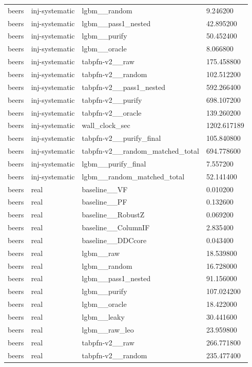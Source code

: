\begin{tabular}{llll}
beers & inj-systematic & lgbm\_\_random & 9.246200 \\
beers & inj-systematic & lgbm\_\_pass1\_nested & 42.895200 \\
beers & inj-systematic & lgbm\_\_purify & 50.452400 \\
beers & inj-systematic & lgbm\_\_oracle & 8.066800 \\
beers & inj-systematic & tabpfn-v2\_\_raw & 175.458800 \\
beers & inj-systematic & tabpfn-v2\_\_random & 102.512200 \\
beers & inj-systematic & tabpfn-v2\_\_pass1\_nested & 592.266400 \\
beers & inj-systematic & tabpfn-v2\_\_purify & 698.107200 \\
beers & inj-systematic & tabpfn-v2\_\_oracle & 139.260200 \\
beers & inj-systematic & wall\_clock\_sec & 1202.617189 \\
beers & inj-systematic & tabpfn-v2\_\_purify\_final & 105.840800 \\
beers & inj-systematic & tabpfn-v2\_\_random\_matched\_total & 694.778600 \\
beers & inj-systematic & lgbm\_\_purify\_final & 7.557200 \\
beers & inj-systematic & lgbm\_\_random\_matched\_total & 52.141400 \\
beers & real & baseline\_\_VF & 0.010200 \\
beers & real & baseline\_\_PF & 0.132600 \\
beers & real & baseline\_\_RobustZ & 0.069200 \\
beers & real & baseline\_\_ColumnIF & 2.835400 \\
beers & real & baseline\_\_DDCcore & 0.043400 \\
beers & real & lgbm\_\_raw & 18.539800 \\
beers & real & lgbm\_\_random & 16.728000 \\
beers & real & lgbm\_\_pass1\_nested & 91.156000 \\
beers & real & lgbm\_\_purify & 107.024200 \\
beers & real & lgbm\_\_oracle & 18.422000 \\
beers & real & lgbm\_\_leaky & 30.441600 \\
beers & real & lgbm\_\_raw\_leo & 23.959800 \\
beers & real & tabpfn-v2\_\_raw & 266.771800 \\
beers & real & tabpfn-v2\_\_random & 235.477400 \\

\end{tabular}
